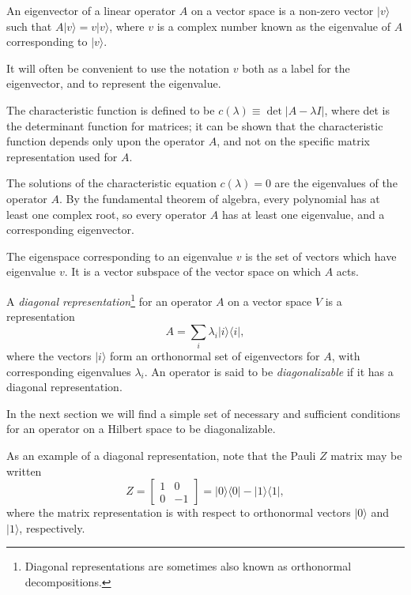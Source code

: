 
\begin{definition}
    An eigenvector of a linear operator $A$ on a vector space is a non-zero vector $|v\rangle$ such that $A|v\rangle=v|v\rangle$, where $v$ is a complex number known as the eigenvalue of $A$ corresponding to $|v\rangle$. 
\end{definition}

\begin{remark}
    It will often be convenient to use the notation $v$ both as a label for the eigenvector, and to represent the eigenvalue. 
\end{remark}


The characteristic function is defined to be $c(\lambda) \equiv \operatorname{det}|A-\lambda I|$, where det is the determinant function for matrices; it can be shown that the characteristic function depends only upon the operator $A$, and not on the specific matrix representation used for $A$. 

The solutions of the characteristic equation $c(\lambda)=0$ are the eigenvalues of the operator $A$. By the fundamental theorem of algebra, every polynomial has at least one complex root, so every operator $A$ has at least one eigenvalue, and a corresponding eigenvector. 

The eigenspace corresponding to an eigenvalue $v$ is the set of vectors which have eigenvalue $v$. It is a vector subspace of the vector space on which $A$ acts.

\begin{definition}
    A \textit{diagonal representation}\footnote{Diagonal representations are sometimes also known as orthonormal decompositions.} for an operator $A$ on a vector space $V$ is a representation 
    $$
  A=\sum_{i} \lambda_{i}|i\rangle\langle i|,
  $$
where the vectors $|i\rangle$ form an orthonormal set of eigenvectors for $A$, with corresponding eigenvalues $\lambda_{i}$. An operator is said to be \textit{diagonalizable} if it has a diagonal representation. 
\end{definition}

In the next section we will find a simple set of necessary and sufficient conditions for an operator on a Hilbert space to be diagonalizable. 

\begin{example}
    As an example of a diagonal representation, note that the Pauli $Z$ matrix may be written
$$
Z=\left[\begin{array}{rr}
1 & 0 \\
0 & -1
\end{array}\right]=|0\rangle\langle 0|-| 1\rangle\langle 1|,
$$
where the matrix representation is with respect to orthonormal vectors $|0\rangle$ and $|1\rangle$, respectively. 
\end{example}

